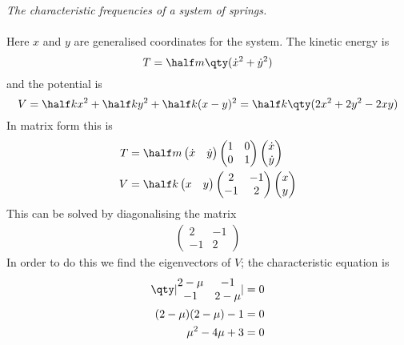   \begin{example}
    \emph{The characteristic frequencies of a system of springs.}\\
     \\ Here $x$ and $y$ are generalised
    coordinates for the system. The kinetic energy is
    \[ T = \half m \qty( \dot{x}^2 + \dot{y}^2 ) \] and the potential
    is
    \[ V = \half k x^2 + \half k y^2 + \half k (x-y)^2 = \half k
    \qty(2 x^2 + 2y^2 - 2xy ) \] In matrix form this is
    \begin{align*}
      T &= \half m
      \begin{pmatrix}
        \dot{x} & \dot{y}
      \end{pmatrix}
      \begin{pmatrix}
        1 & 0 \\ 0 & 1
      \end{pmatrix}
      \begin{pmatrix}
        \dot{x} \\ \dot{y}
      \end{pmatrix} \\
      V &= \half k
      \begin{pmatrix}
        x & y
      \end{pmatrix}
      \begin{pmatrix}
        2 & -1 \\ -1 & 2
      \end{pmatrix}
      \begin{pmatrix}
        x \\ y
      \end{pmatrix} \\
    \end{align*}
This can be solved by diagonalising the matrix 
\begin{align*}
  \begin{pmatrix}
    2 & -1 \\ -1 & 2
  \end{pmatrix}
\end{align*}
In order to do this we find the eigenvectors of $V$; the characteristic equation is 
\begin{align*}
  \qty|
  \begin{matrix}
    2 - \mu & -1 \\ -1 & 2 - \mu
  \end{matrix} | &= 0 \\
  (2 - \mu)(2-\mu)-1 &=0 \\
\mu^2 - 4 \mu + 3 &=0 \\

\end{align*}
\end{example}
